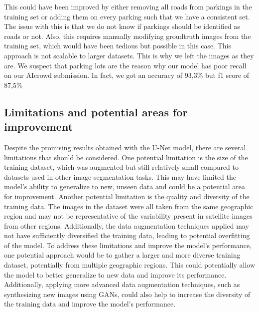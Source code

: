 \documentclass[10pt,conference,compsocconf]{IEEEtran}
\begin{document}
This could have been improved by either removing all roads from parkings in the training set or adding them on every parking such that we have a consistent set. The issue with this is that we do not know if parkings should be identified as roads or not. Also, this requires manually modifying groudtruth images from the training set, which would have been tedious but possible in this case. This approach is not scalable to larger datasets. This is why we left the images as they are. We suspect that parking lots are the reason why our model has poor recall on our AIcrowd submission. In fact, we got an accuracy of 93,3\% but f1 score of 87,5\%
\subsection{Limitations and potential areas for improvement}
Despite the promising results obtained with the U-Net model, there are several limitations that should be considered. One potential limitation is the size of the training dataset, which was augmented but still relatively small compared to datasets used in other image segmentation tasks. This may have limited the model's ability to generalize to new, unseen data and could be a potential area for improvement.
\newline
Another potential limitation is the quality and diversity of the training data. The images in the dataset were all taken from the same geographic region and may not be representative of the variability present in satellite images from other regions. Additionally, the data augmentation techniques applied may not have sufficiently diversified the training data, leading to potential overfitting of the model.
\newline
To address these limitations and improve the model's performance, one potential approach would be to gather a larger and more diverse training dataset, potentially from multiple geographic regions. This could potentially allow the model to better generalize to new data and improve its performance. Additionally, applying more advanced data augmentation techniques, such as synthesizing new images using GANs, could also help to increase the diversity of the training data and improve the model's performance.
\end{document}
